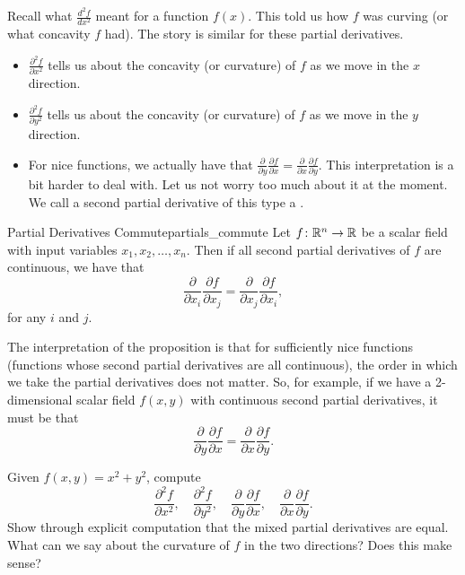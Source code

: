                         Recall what $\frac{d^2 f}{dx^2}$ meant for a function $f(x)$.  This told us how $f$ was curving (or what concavity $f$ had). The story is similar for these partial derivatives.
                        
                        \begin{itemize}
                            \item $\frac{\partial^2 f}{\partial x^2}$ tells us about the concavity (or curvature) of $f$ as we move in the $x$ direction.
                            \item $\frac{\partial^2 f}{\partial y^2}$ tells us about the concavity (or curvature) of $f$ as we move in the $y$ direction.
                            \item For nice functions, we actually have that $\frac{\partial}{\partial y}\frac{\partial f}{\partial x}=\frac{\partial}{\partial x}\frac{\partial f}{\partial y}$.  This interpretation is a bit harder to deal with.  Let us not worry too much about it at the moment. We call a second partial derivative of this type a .
                        \end{itemize}
                        
                        \begin{prop}{Partial Derivatives Commute}{partials_commute}
                        Let $f \colon \mathbb{R}^n \to \mathbb{R}$ be a scalar field with input variables $x_1,x_2,\dots,x_n$. Then if all second partial derivatives of $f$ are continuous, we have that
                        \[
                        \frac{\partial}{\partial x_i}\frac{\partial f}{\partial x_j}=\frac{\partial}{\partial x_j}\frac{\partial f}{\partial x_i},
                        \]
                        for any $i$ and $j$.
                        \end{prop}

                        The interpretation of the proposition is that for sufficiently nice functions (functions whose second partial derivatives are all continuous), the order in which we take the partial derivatives does not matter. So, for example, if we have a 2-dimensional scalar field $f(x,y)$ with continuous second partial derivatives, it must be that
                        \[
\frac{\partial}{\partial y}\frac{\partial f}{\partial x}=\frac{\partial}{\partial x}\frac{\partial f}{\partial y}.
                        \]
                    
                        
                        \begin{exercise}
                        Given $f(x,y)=x^2+y^2$, compute
                        \[
                        \frac{\partial^2 f}{\partial x^2}, \quad \frac{\partial^2 f}{\partial y^2}, \quad \frac{\partial}{\partial y}\frac{\partial f}{\partial x},\quad \frac{\partial}{\partial x}\frac{\partial f}{\partial y}.
                        \]
                        Show through explicit computation that the mixed partial derivatives are equal. What can we say about the curvature of $f$ in the two directions? Does this make sense?
                        \end{exercise}

